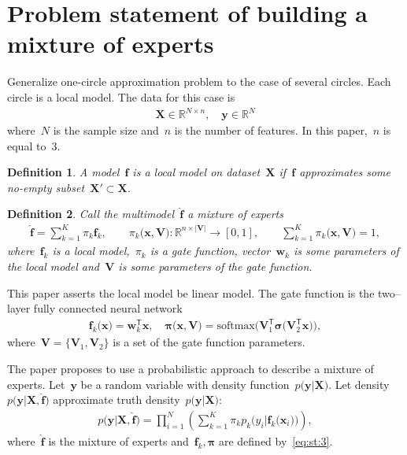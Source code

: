 \documentclass[12pt, twoside]{article}
\newtheorem{definition}{Definition}[section]
\numberwithin{equation}{section}
\begin{document}
\section{Problem statement of building a mixture of experts}
Generalize one-circle approximation problem to the case of several circles.
Each circle is a local model.
The data for this case is
\[
\label{eq:st:1}
\begin{aligned}
\textbf{X} \in \mathbb{R}^{N \times n}, \quad \textbf{y}\in \mathbb{R}^{N}
\end{aligned}
\]
where~$N$ is the sample size and~$n$ is the number of features. In this paper,~$n$ is equal to~$3$.

\begin{definition}
\label{def:1}
A model~$\mathbf{f}$ is a local model on dataset~$\textbf{X}$ if~$\mathbf{f}$ approximates some no-empty subset~$\textbf{X}'\subset\textbf{X}$.
\end{definition}

\begin{definition}
\label{def:2}
Call the multimodel~$\hat{\mathbf{f}}$ a mixture of experts
\[
\label{eq:st:2}
\begin{aligned}
\hat{\mathbf{f}} = \sum_{k=1}^{K}\pi_{k}\mathbf{f}_k, \qquad \pi_{k}\bigr(\mathbf{x}, \mathbf{V}\bigr):\mathbb{R}^{n\times \left|\mathbf{V}\right|} \to [0, 1], \qquad \sum_{k=1}^{K}\pi_{k}\bigr(\mathbf{x}, \mathbf{V}\bigr) = 1,
\end{aligned}
\]
where~$\mathbf{f}_k$ is a local model,~$\pi_k$ is a gate function, vector~$\mathbf{w}_k$ is some parameters of the local model and~$\mathbf{V}$ is some parameters of the gate function.
\end{definition}

This paper asserts the local model be linear model. The gate function is the two--layer fully connected neural network
\[
\label{eq:st:3}
\begin{aligned}
\mathbf{f}_k\bigr(\textbf{x}\bigr) = \textbf{w}_k^{\mathsf{T}}\textbf{x}, \quad
\bm{\pi}\bigr(\mathbf{x}, \mathbf{V}\bigr) = \text{softmax}\bigr(\mathbf{V}_{1}^{\mathsf{T}}\bm{\sigma}\bigr(\mathbf{V}_2^{\mathsf{T}}\mathbf{x}\bigr)\bigr),
\end{aligned}
\]
where~$\mathbf{V} = \bigr\{\mathbf{V}_1, \mathbf{V}_2\bigr\}$ is a set of the gate function parameters.

The paper proposes to use a probabilistic approach to describe a mixture of experts. Let~$\textbf{y}$ be a random variable with density function~$p\bigr(\textbf{y}|\textbf{X}\bigr)$. Let density~$p\bigr(\textbf{y}|\textbf{X}, \hat{\textbf{f}}\bigr)$ approximate truth density~$p\bigr(\textbf{y}|\textbf{X}\bigr)$:
\[
\label{eq:st:new:1}
\begin{aligned}
p\bigr(\textbf{y}|\textbf{X}, \hat{\textbf{f}}\bigr) = \prod_{i=1}^{N}\left(\sum_{k=1}^{K}\pi_kp_{k}\bigr(y_{i}|\textbf{f}_{k}\bigr(\mathbf{x}_{i}\bigr)\bigr)\right),
\end{aligned}
\]
where~$\hat{\textbf{f}}$ is the mixture of experts and~$\textbf{f}_k, \bm{\pi}$ are defined by~\eqref{eq:st:3}.
\end{document}

